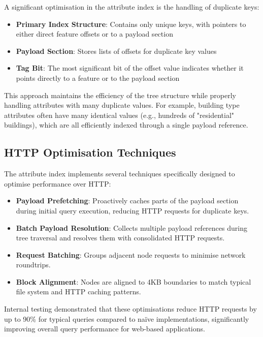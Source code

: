 A significant optimisation in the attribute index is the handling of duplicate keys:

\begin{itemize}
    \item \textbf{Primary Index Structure}: Contains only unique keys, with pointers to either direct feature offsets or to a payload section
    \item \textbf{Payload Section}: Stores lists of offsets for duplicate key values
    \item \textbf{Tag Bit}: The most significant bit of the offset value indicates whether it points directly to a feature or to the payload section
\end{itemize}

This approach maintains the efficiency of the tree structure while properly handling attributes with many duplicate values. For example, building type attributes often have many identical values (e.g., hundreds of "residential" buildings), which are all efficiently indexed through a single payload reference.

\subsection{HTTP Optimisation Techniques}
\label{methodology:attribute_index:http_optimisation}

The attribute index implements several techniques specifically designed to optimise performance over HTTP:

\begin{itemize}
    \item \textbf{Payload Prefetching}: Proactively caches parts of the payload section during initial query execution, reducing HTTP requests for duplicate keys.
    \item \textbf{Batch Payload Resolution}: Collects multiple payload references during tree traversal and resolves them with consolidated HTTP requests.
    \item \textbf{Request Batching}: Groups adjacent node requests to minimise network roundtrips.
    \item \textbf{Block Alignment}: Nodes are aligned to 4KB boundaries to match typical file system and HTTP caching patterns.
\end{itemize}

Internal testing demonstrated that these optimisations reduce HTTP requests by up to 90\% for typical queries compared to naïve implementations, significantly improving overall query performance for web-based applications.

